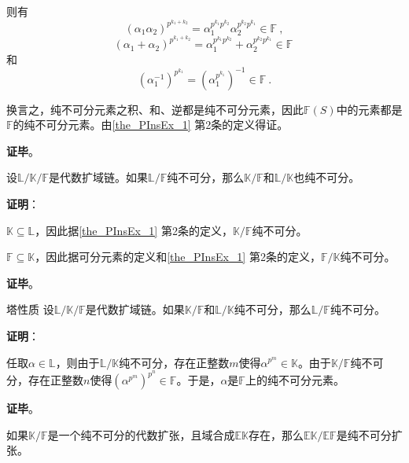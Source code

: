则有
\begin{equation}\label{eq_PInsEx_1}
(\alpha_1\alpha_2)^{p^{k_1+k_2}}=\alpha_1^{p^{k_1}p^{k_2}}\alpha_2^{p^{k_2}p^{k_1}}\in\mathbb{F}~,
\end{equation}
\begin{equation}\label{eq_PInsEx_2}
(\alpha_1+\alpha_2)^{p^{k_1+k_2}}=\alpha_1^{p^{k_1}p^{k_2}}+\alpha_2^{p^{k_2}p^{k_1}}\in\mathbb{F}~
\end{equation}
和
\begin{equation}\label{eq_PInsEx_3}
(\alpha_1^{-1})^{p^{k_1}} = (\alpha_1^{p^{k_1}})^{-1} \in\mathbb{F}~.
\end{equation}

换言之，纯不可分元素之积、和、逆都是纯不可分元素，因此$\mathbb{F}(S)$中的元素都是$\mathbb{F}$的纯不可分元素。由\autoref{the_PInsEx_1} 第2条的定义得证。

\textbf{证毕}。




\begin{theorem}{}
设$\mathbb{L}/\mathbb{K}/\mathbb{F}$是代数扩域链。如果$\mathbb{L}/\mathbb{F}$纯不可分，那么$\mathbb{K}/\mathbb{F}$和$\mathbb{L}/\mathbb{K}$也纯不可分。
\end{theorem}

\textbf{证明}：

$\mathbb{K}\subseteq\mathbb{L}$，因此据\autoref{the_PInsEx_1} 第2条的定义，$\mathbb{K}/\mathbb{F}$纯不可分。

$\mathbb{F}\subseteq\mathbb{K}$，因此据可分元素的定义和\autoref{the_PInsEx_1} 第2条的定义，$\mathbb{F}/\mathbb{K}$纯不可分。


\textbf{证毕}。


\begin{theorem}{塔性质}
设$\mathbb{L}/\mathbb{K}/\mathbb{F}$是代数扩域链。如果$\mathbb{K}/\mathbb{F}$和$\mathbb{L}/\mathbb{K}$纯不可分，那么$\mathbb{L}/\mathbb{F}$纯不可分。
\end{theorem}

\textbf{证明}：

任取$\alpha\in\mathbb{L}$，则由于$\mathbb{L}/\mathbb{K}$纯不可分，存在正整数$m$使得$\alpha^{p^m}\in\mathbb{K}$。由于$\mathbb{K}/\mathbb{F}$纯不可分，存在正整数$n$使得$(\alpha^{p^m})^{p^n}\in\mathbb{F}$。于是，$\alpha$是$\mathbb{F}$上的纯不可分元素。

\textbf{证毕}。


\begin{theorem}{}
如果$\mathbb{K}/\mathbb{F}$是一个纯不可分的代数扩张，且域合成$\mathbb{EK}$存在，那么$\mathbb{EK}/\mathbb{EF}$是纯不可分扩张。
\end{theorem}


